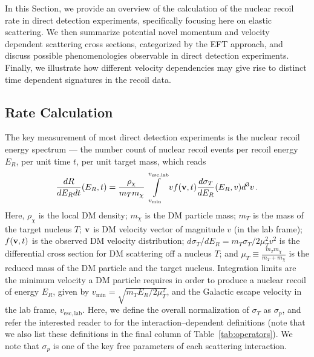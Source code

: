\documentclass[11pt, a4paper]{article}
\begin{document}
In this Section, we provide an overview of the calculation of the nuclear recoil rate in direct detection experiments, specifically focusing here on elastic scattering. We then summarize potential novel momentum and velocity dependent scattering cross sections, categorized by the EFT approach, and discuss possible phenomenologies observable in direct detection experiments. Finally, we illustrate how different velocity dependencies may give rise to distinct time dependent signatures in the recoil data.

\subsection{Rate Calculation}\label{sec:rate}

The key measurement of most direct detection experiments is the nuclear recoil energy spectrum --- the number count of nuclear recoil events per recoil energy $E_R$, per unit time $t$, per unit target mass, which reads
\begin{equation}
\frac{dR}{dE_R dt}(E_R,t) =  \frac{\rho_\chi}{m_T m_\chi} \int\limits_{v_{\mathrm{min}}}^{v_{\mathrm{esc, lab}}}  v f(\mathrm{\mbox{\bf{v}}},t) \frac{d\sigma_T}{dE_R} (E_R,v) d^3v \, .
\label{eq:dRdEr_general}
\end{equation}
Here, $\rho_\chi$ is the local DM density; $m_\chi$ is the DM particle mass; $m_T$ is the mass of the target nucleus $T$; $\mathrm{\mbox{\bf{v}}}$ is DM velocity vector of magnitude $v$ (in the lab frame); $f(\mathrm{\mbox{\bf{v}}}, t)$ is the observed DM velocity distribution; $d\sigma_T/dE_R=m_T \sigma_T /2\mu_T^2 v^2$ is the differential cross section for DM scattering off a nucleus $T$; and $\mu_T\equiv\frac{m_Tm_\chi}{m_T+m_\chi}$ is the reduced mass of the DM particle and the target nucleus. Integration limits are the minimum velocity a DM particle requires in order to produce a nuclear recoil of energy $E_R$, given by $v_\mathrm{min} = \sqrt{m_T E_R/2\mu_T^2}$, and the Galactic escape velocity in the lab frame, $v_{\mathrm{esc, lab}}$. Here, we define the overall normalization of $\sigma_T$ as $\sigma_p$, and refer the interested reader to \cite{Gluscevic:2015sqa} for the interaction--dependent definitions (note that we also list these definitions in the final column of Table~\ref{tab:operators}). We note that $\sigma_p$ is one of the key free parameters of each scattering interaction.
\end{document}
